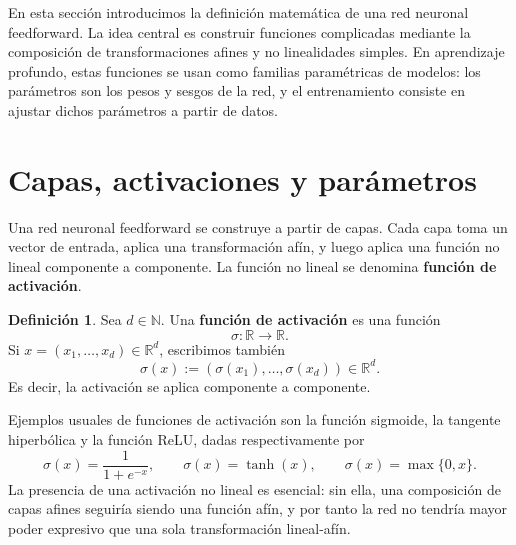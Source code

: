 \documentclass[11pt]{report}
\newenvironment{tcolorbox}[1][]{\par\medskip\noindent\ignorespaces}{\par\medskip}
\theoremstyle{definition}
\newtheorem{definicion}{Definición}[section]
\theoremstyle{plain}
\numberwithin{equation}{section}
\begin{document}
En esta sección introducimos la definición matemática de una red neuronal feedforward. La idea central es construir funciones complicadas mediante la composición de transformaciones afines y no linealidades simples. En aprendizaje profundo, estas funciones se usan como familias paramétricas de modelos: los parámetros son los pesos y sesgos de la red, y el entrenamiento consiste en ajustar dichos parámetros a partir de datos.

\section{Capas, activaciones y parámetros}

Una red neuronal feedforward se construye a partir de capas. Cada capa toma un vector de entrada, aplica una transformación afín, y luego aplica una función no lineal componente a componente. La función no lineal se denomina \textbf{función de activación}.

\begin{tcolorbox}[colback=blue!8, colframe=blue!8, boxrule=0pt]
\begin{definicion}
Sea \(d\in\mathbb{N}\). Una \textbf{función de activación} es una función
\begin{equation*}
    \sigma:\mathbb{R}\to\mathbb{R}.
\end{equation*}
Si \(x=(x_1,\ldots,x_d)\in\mathbb{R}^d\), escribimos también
\begin{equation*}
    \sigma(x)
    :=
    (\sigma(x_1),\ldots,\sigma(x_d))
    \in\mathbb{R}^d.
\end{equation*}
Es decir, la activación se aplica componente a componente.
\end{definicion}
\end{tcolorbox}

Ejemplos usuales de funciones de activación son la función sigmoide, la tangente hiperbólica y la función ReLU, dadas respectivamente por
\begin{equation*}
    \sigma(x)=\frac{1}{1+e^{-x}},
    \qquad
    \sigma(x)=\tanh(x),
    \qquad
    \sigma(x)=\max\{0,x\}.
\end{equation*}
La presencia de una activación no lineal es esencial: sin ella, una composición de capas afines seguiría siendo una función afín, y por tanto la red no tendría mayor poder expresivo que una sola transformación lineal-afín.
\end{document}
